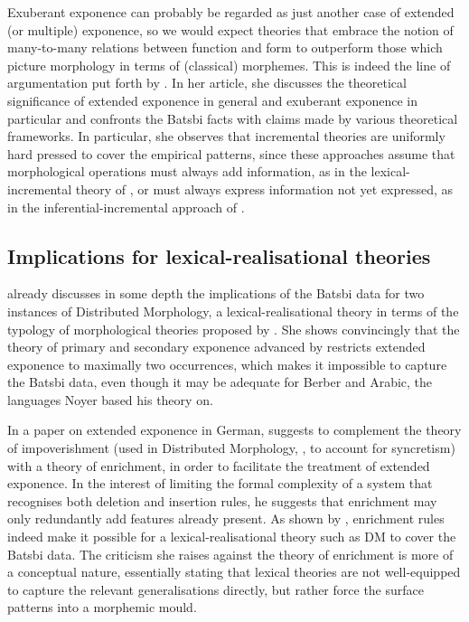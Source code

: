 \documentclass[output=paper]{langsci/langscibook}
\begin{document}
Exuberant exponence can probably be regarded as just another case of
extended (or multiple) exponence, so we would expect theories that
embrace the notion of many-to-many relations between function and form
to outperform those which picture  morphology
in terms of (classical) morphemes. This is indeed the
line of argumentation put forth by \citet{Harris09}. In her article,
she discusses the theoretical significance of extended exponence in
general and exuberant exponence in particular and confronts the Batsbi
facts with claims made by various theoretical frameworks. In
particular, she observes that incremental theories are uniformly hard
pressed to cover the empirical patterns, since these approaches assume
that morphological operations must always add information, as in the
lexical-incremental theory of \citet{Wunderlich95}, or must always
express information not yet expressed, as in the
inferential-incremental approach of \citet{Steele95}.




\subsection{Implications for lexical-realisational theories}

\citet{Harris09} already discusses in some depth the implications of
the Batsbi data for two instances of Distributed Morphology, a
lexical-realisational theory in terms of the typology of morphological
theories proposed by \citet{Stump01}.  She shows convincingly that
the theory of primary and secondary exponence advanced by
\citet{Noyer92} restricts extended exponence to maximally two
occurrences, which makes it impossible to capture the Batsbi data,
even though it may be adequate for Berber and Arabic, the languages
Noyer based his theory on.

In a paper on extended exponence in German, \citet{MuellerGereon07} suggests
to complement the theory of impoverishment (used in Distributed Morphology,
 \citealt{Halle93}, to account for syncretism) with a
theory of enrichment, in order to facilitate the treatment of extended
exponence. In the interest of limiting the formal complexity of a system that
recognises both deletion and insertion rules, he suggests that
enrichment may only redundantly add features already present. As shown by
\citet{Harris09}, enrichment rules indeed make it possible for a
lexical-realisational theory such as DM to cover the Batsbi
data.  The criticism she raises against the theory of enrichment is
more of a conceptual nature, essentially stating that lexical theories
are not well-equipped to capture the relevant generalisations directly,
but rather force the surface patterns into a
morphemic mould. 
\end{document}
